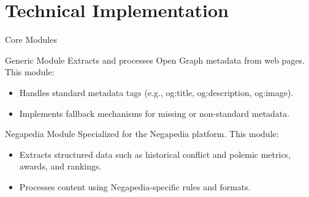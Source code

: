 \documentclass{beamer}
\begin{document}
\section{Technical Implementation}
    \begin{frame}{Core Modules}
        \begin{block}{Generic Module}
            Extracts and processes Open Graph metadata from web pages. This module:
            \begin{itemize}
                \item Handles standard metadata tags (e.g., og:title, og:description, og:image).
                \item Implements fallback mechanisms for missing or non-standard metadata.
            \end{itemize}
        \end{block}

        \begin{block}{Negapedia Module}
            Specialized for the Negapedia platform.
            This module:
            \begin{itemize}
                \item Extracts structured data such as historical conflict and polemic metrics, awards, and rankings.
                \item Processes content using Negapedia-specific rules and formats.
            \end{itemize}
        \end{block}
    \end{frame}

\end{document}
